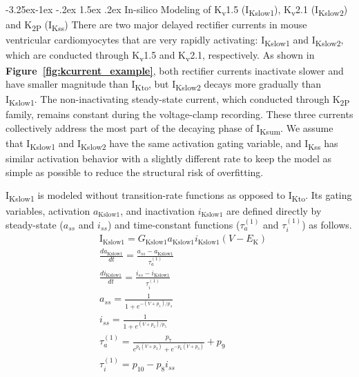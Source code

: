 \documentclass[11pt]{article}
\makeatletter
\renewcommand\subsubsection{\@startsection{subsubsection}{3}{\z@}%
                                    {-3.25ex\@plus -1ex \@minus -.2ex}%
                                     {1.5ex \@plus .2ex}%
                                     {\normalfont\normalsize\fontfamily{phv}\fontsize{14}{17}\selectfont}}
\makeatother
\begin{document}
\subsubsection{In-silico Modeling of K\textsubscript{v}1.5 (I\textsubscript{Kslow1}), K\textsubscript{v}2.1 (I\textsubscript{Kslow2}) and K\textsubscript{2P} (I\textsubscript{Kss})}
There are two major delayed rectifier currents in mouse ventricular cardiomyocytes that are very rapidly activating: I\textsubscript{Kslow1} and I\textsubscript{Kslow2}, which are conducted through K\textsubscript{v}1.5 and K\textsubscript{v}2.1, respectively. As shown in \textbf{Figure~\ref{fig:kcurrent_example}}, both rectifier currents inactivate slower and have smaller magnitude than I\textsubscript{Kto}, but I\textsubscript{Kslow2} decays more gradually than I\textsubscript{Kslow1}. The non-inactivating steady-state current, which conducted through K\textsubscript{2P} family, remains constant during the voltage-clamp recording. These three currents collectively address the most part of the decaying phase of I\textsubscript{Ksum}. We assume that I\textsubscript{Kslow1} and I\textsubscript{Kslow2} have the same activation gating variable, and I\textsubscript{Kss} has similar activation behavior with a slightly different rate to keep the model as simple as possible to reduce the structural risk of overfitting.

I\textsubscript{Kslow1} is modeled without transition-rate functions as opposed to I\textsubscript{Kto}. Its gating variables, activation $a_{\mathrm{Kslow1}}$, and inactivation $i_{\mathrm{Kslow1}}$ are defined directly by steady-state ($a_{ss}$ and $i_{ss}$) and time-constant functions ($\tau_{a}^{(1)}$ and $\tau_{i}^{(1)}$) as follows.
\begin{align}
    &\mathrm{I}_{\mathrm{Kslow1}} = G_{\mathrm{Kslow1}}a_{\mathrm{Kslow1}}i_{\mathrm{Kslow1}}(V-E_{\mathrm{K}}) \\
    &\frac{da_{\mathrm{Kslow1}}}{dt} = \frac{a_{ss}-a_{\mathrm{Kslow1}}}{\tau_{a}^{(1)}} \\
    &\frac{di_{\mathrm{Kslow1}}}{dt} = \frac{i_{ss}-i_{\mathrm{Kslow1}}}{\tau_{i}^{(1)}} \\
    &a_{ss} = \frac{1}{1+e^{-(V+p_{1})/p_{4}}} \\
    &i_{ss} = \frac{1}{1+e^{(V+p_{2})/p_{5}}} \\
    &\tau_{a}^{(1)} = \frac{p_{7}}{e^{p_{6}(V+p_{3})} + e^{-p_{6}(V+p_{3})}} + p_{9} \\
    &\tau_{i}^{(1)} = p_{10} - p_{8}i_{ss}
\end{align}
\end{document}
